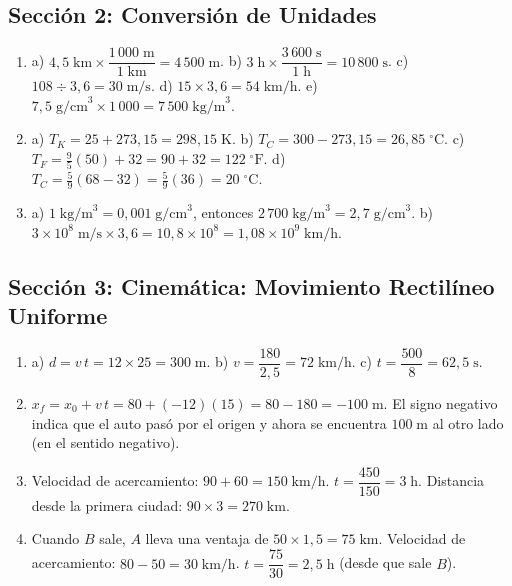 \documentclass[12pt, letterpaper]{article}
\begin{document}
  \newpage

  \subsection*{Sección 2: Conversión de Unidades}

  \begin{enumerate}[leftmargin=*, label=\textbf{\arabic*.}]
    \item
          a) $4{,}5\;\text{km} \times \dfrac{1\,000\;\text{m}}{1\;\text{km}} = 4\,500\;\text{m}$.
          \quad b) $3\;\text{h} \times \dfrac{3\,600\;\text{s}}{1\;\text{h}} = 10\,800\;\text{s}$.
          \quad c) $108 \div 3{,}6 = 30\;\text{m/s}$.
          \quad d) $15 \times 3{,}6 = 54\;\text{km/h}$.
          \quad e) $7{,}5\;\text{g/cm}^3 \times 1\,000 = 7\,500\;\text{kg/m}^3$.

    \item a) $T_K = 25 + 273{,}15 = 298{,}15\;\text{K}$.
          \quad b) $T_C = 300 - 273{,}15 = 26{,}85\;^\circ\text{C}$.
          \quad c) $T_F = \frac{9}{5}(50) + 32 = 90 + 32 = 122\;^\circ\text{F}$.
          \quad d) $T_C = \frac{5}{9}(68 - 32) = \frac{5}{9}(36) = 20\;^\circ\text{C}$.

    \item a) $1\;\text{kg/m}^3 = 0{,}001\;\text{g/cm}^3$, entonces $2\,700\;\text{kg/m}^3 = 2{,}7\;\text{g/cm}^3$.
          \quad b) $3 \times 10^8\;\text{m/s} \times 3{,}6 = 10{,}8 \times 10^8 = 1{,}08 \times 10^9\;\text{km/h}$.
  \end{enumerate}

  \newpage

  \subsection*{Sección 3: Cinemática: Movimiento Rectilíneo Uniforme}

  \begin{enumerate}[leftmargin=*, label=\textbf{\arabic*.}]
    \item a) $d = v\,t = 12 \times 25 = 300\;\text{m}$. \quad
          b) $v = \dfrac{180}{2{,}5} = 72\;\text{km/h}$. \quad
          c) $t = \dfrac{500}{8} = 62{,}5\;\text{s}$.

    \item $x_f = x_0 + v\,t = 80 + (-12)(15) = 80 - 180 = -100\;\text{m}$.
          El signo negativo indica que el auto pasó por el origen y ahora se encuentra $100\;\text{m}$ al otro lado (en el sentido negativo).

    \item Velocidad de acercamiento: $90 + 60 = 150\;\text{km/h}$. \quad $t = \dfrac{450}{150} = 3\;\text{h}$.
          Distancia desde la primera ciudad: $90 \times 3 = 270\;\text{km}$.

    \item Cuando $B$ sale, $A$ lleva una ventaja de $50 \times 1{,}5 = 75\;\text{km}$.
          Velocidad de acercamiento: $80 - 50 = 30\;\text{km/h}$. \quad $t = \dfrac{75}{30} = 2{,}5\;\text{h}$ (desde que sale $B$).
  \end{enumerate}
\end{document}
